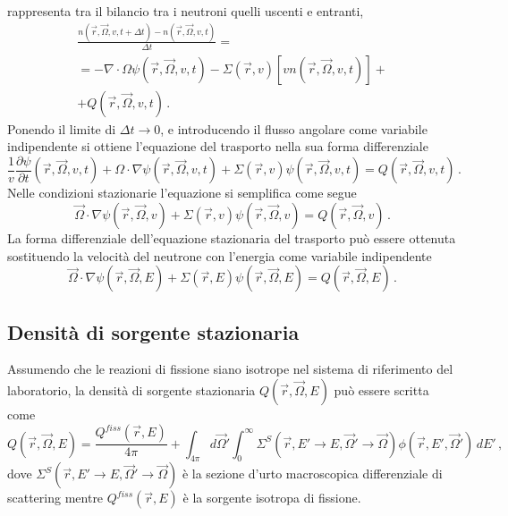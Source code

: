 rappresenta tra il bilancio tra i neutroni quelli uscenti e entranti,
\begin{multline}
\frac{n(\vec{r},\vec{\Omega},v,t+\Delta t) - n(\vec{r},\vec{\Omega},v,t)}{\Delta 
t}= \\= - \nabla \cdot \Omega \psi(\vec{r},\vec{\Omega},v,t) 
-\Sigma(\vec{r},v)[vn(\vec{r},\vec{\Omega},v,t)]+ \\
+Q(\vec{r},\vec{\Omega},v,t) \,.
\end{multline}
Ponendo il limite di $\Delta t \rightarrow 0$, e introducendo il flusso angolare 
come variabile indipendente si ottiene l'equazione del trasporto nella sua forma 
differenziale
\begin{equation}
\frac{1}{v}\frac{\partial \psi}{\partial t}(\vec{r},\vec{\Omega},v,t)+\Omega 
\cdot \nabla \psi(\vec{r},\vec{\Omega},v,t)+ 
\Sigma(\vec{r},v)\psi(\vec{r},\vec{\Omega},v,t)=Q(\vec{r},\vec{\Omega},v,t) \,.
\end{equation}
Nelle condizioni stazionarie l'equazione si semplifica come segue
\begin{equation}
\vec{\Omega} \cdot \nabla \psi(\vec{r},\vec{\Omega},v)+ 
\Sigma(\vec{r},v)\psi(\vec{r},\vec{\Omega},v)=Q(\vec{r},\vec{\Omega},v) \,.
\end{equation}
La forma differenziale dell'equazione stazionaria del trasporto può essere 
ottenuta sostituendo la velocità del neutrone con l'energia come variabile indipendente
\begin{equation}
\label{eqtrasta}
\vec{\Omega} \cdot \nabla \psi(\vec{r},\vec{\Omega},E)+ 
\Sigma(\vec{r},E)\psi(\vec{r},\vec{\Omega},E)=Q(\vec{r},\vec{\Omega},E) \,.
\end{equation}

\subsection{Densità di sorgente stazionaria}
Assumendo che le reazioni di fissione siano isotrope nel sistema di riferimento 
del laboratorio, la densità di sorgente stazionaria $Q(\vec{r},\vec{\Omega},E)$ 
può essere scritta come
\begin{equation}
\label{denssorg}
Q(\vec{r},\vec{\Omega},E)=\frac{Q^{fiss}(\vec{r},E)}{4\pi}+\int_{4\pi}d\vec{
\Omega}'\int_0^\infty \Sigma^S(\vec{r},E'\rightarrow E,\vec{\Omega}'\rightarrow 
\vec{\Omega})\phi(\vec{r},E',\vec{\Omega}')\, dE' \,,
\end{equation}
dove $\Sigma^S(\vec{r},E'\rightarrow E,\vec{\Omega}'\rightarrow \vec{\Omega})$ è 
la sezione d'urto macroscopica differenziale di scattering mentre $ 
Q^{fiss}(\vec{r},E)$ è la sorgente isotropa di fissione.

